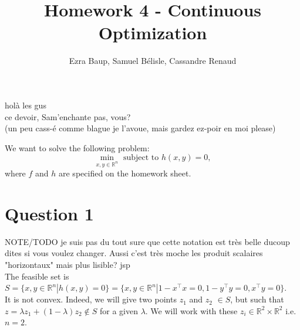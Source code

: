 \documentclass{article}
\title{Homework 4 - Continuous Optimization}
\author{\xcancel{Estelle} Ezra Baup, Samuel Bélisle, Cassandre Renaud }
\newcommand{\R}{\mathbb{R}}
\begin{document}
\maketitle

holà les gus \\
ce devoir, Sam'enchante pas, vous?\\
(un peu cass-é comme blague je l'avoue, mais gardez ez-poir en moi please)

We want to solve the following problem:
\begin{equation*} \tag{P}\label{P}
\min_{x,y\in\R^n} \text{ subject to } h(x,y)=0,
\end{equation*}
where $f$ and $h$ are specified on the homework sheet.

\section*{Question 1}

NOTE/TODO je suis pas du tout sure que cette notation est très belle ducoup dites si vous voulez changer. Aussi c'est très moche les produit scalaires "horizontaux" mais plus lisible? jsp\\

The feasible set is $S=\{x,y \in \R^n | h(x,y)=0\}=\{x,y \in \R^n | 1-x^\top x=0, 1-y^\top y=0, x^\top y=0 \}$. \\
It is not convex. Indeed, we will give two points $z_1$ and $z_2$ $\in S$, but such that $z=\lambda z_1 + (1-\lambda) z_2 \notin S$ for a given $\lambda$. We will work with these $z_i \in \R^2 \times \R^2$ i.e. $n=2$.\\
\end{document}
